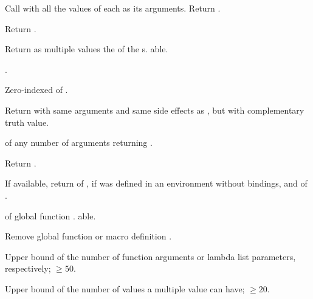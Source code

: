 \begin{LIST}{1cm}
  {
    Call  with all the values of each  as its
    arguments. Return .
  }

  {
    Return .
  }

  {
    Return as multiple values the  of the
    s. able.
  }

  {
    .
  }

  {
    Zero-indexed  of .
  }

  {
    Return  with same arguments and same side effects
    as , but with complementary truth value.
  }

  {
     of any number of arguments returning .
  }

  {
    Return .
  }

  {
    If available, return  of ,
    \retvalii{\NIL} if  was defined in an environment
    without bindings, and  of .
  }

  {
     of global function . able.
  }

  {
    Remove global function or macro definition .
  }

  {
    Upper bound of the number of function arguments or lambda list
    parameters, respectively; $\geq50$.
  }

  {
    Upper bound of the number of values a multiple value can have;
    $\geq20$.
  }

\end{LIST}


